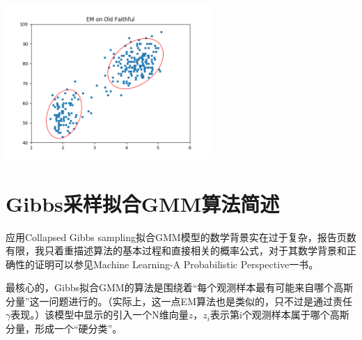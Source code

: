 \documentclass[hyperref,UTF8]{ctexart}
\begin{document}
\centerline{\includegraphics[height=2.3in]{exp-results/em_OF.png}}




\section*{Gibbs采样拟合GMM算法简述}
应用Collapsed Gibbs sampling拟合GMM模型的数学背景实在过于复杂，报告页数有限，我只着重描述算法的基本过程和直接相关的概率公式，对于其数学背景和正确性的证明可以参见Machine Learning-A Probabilistic Perspective一书。
\par 最核心的，Gibbs拟合GMM的算法是围绕着“每个观测样本最有可能来自哪个高斯分量”这一问题进行的。（实际上，这一点EM算法也是类似的，只不过是通过责任$\gamma$表现。）该模型中显示的引入一个N维向量$z$，$z_i$表示第i个观测样本属于哪个高斯分量，形成一个“硬分类”。
\end{document}
